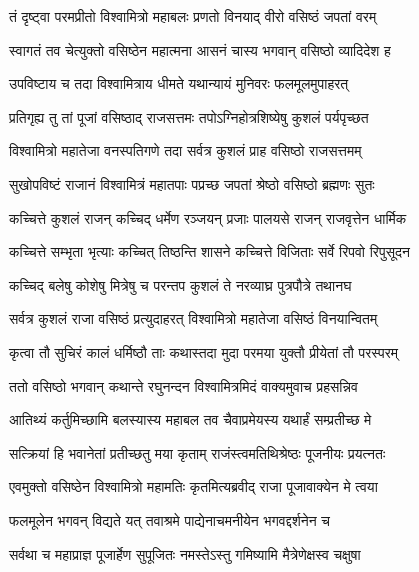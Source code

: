 
\twolineshloka
{तं दृष्ट्वा परमप्रीतो विश्वामित्रो महाबलः}
{प्रणतो विनयाद् वीरो वसिष्ठं जपतां वरम्} %

\twolineshloka
{स्वागतं तव चेत्युक्तो वसिष्ठेन महात्मना}
{आसनं चास्य भगवान् वसिष्ठो व्यादिदेश ह} %

\twolineshloka
{उपविष्टाय च तदा विश्वामित्राय धीमते}
{यथान्यायं मुनिवरः फलमूलमुपाहरत्} %

\twolineshloka
{प्रतिगृह्य तु तां पूजां वसिष्ठाद् राजसत्तमः}
{तपोऽग्निहोत्रशिष्येषु कुशलं पर्यपृच्छत} %

\twolineshloka
{विश्वामित्रो महातेजा वनस्पतिगणे तदा}
{सर्वत्र कुशलं प्राह वसिष्ठो राजसत्तमम्} %

\twolineshloka
{सुखोपविष्टं राजानं विश्वामित्रं महातपाः}
{पप्रच्छ जपतां श्रेष्ठो वसिष्ठो ब्रह्मणः सुतः} %

\twolineshloka
{कच्चित्ते कुशलं राजन् कच्चिद् धर्मेण रञ्जयन्}
{प्रजाः पालयसे राजन् राजवृत्तेन धार्मिक} %

\twolineshloka
{कच्चित्ते सम्भृता भृत्याः कच्चित् तिष्ठन्ति शासने}
{कच्चित्ते विजिताः सर्वे रिपवो रिपुसूदन} %

\twolineshloka
{कच्चिद् बलेषु कोशेषु मित्रेषु च परन्तप}
{कुशलं ते नरव्याघ्र पुत्रपौत्रे तथानघ} %

\twolineshloka
{सर्वत्र कुशलं राजा वसिष्ठं प्रत्युदाहरत्}
{विश्वामित्रो महातेजा वसिष्ठं विनयान्वितम्} %

\twolineshloka
{कृत्वा तौ सुचिरं कालं धर्मिष्ठौ ताः कथास्तदा}
{मुदा परमया युक्तौ प्रीयेतां तौ परस्परम्} %

\twolineshloka
{ततो वसिष्ठो भगवान् कथान्ते रघुनन्दन}
{विश्वामित्रमिदं वाक्यमुवाच प्रहसन्निव} %

\twolineshloka
{आतिथ्यं कर्तुमिच्छामि बलस्यास्य महाबल}
{तव चैवाप्रमेयस्य यथार्हं सम्प्रतीच्छ मे} %

\twolineshloka
{सत्क्रियां हि भवानेतां प्रतीच्छतु मया कृताम्}
{राजंस्त्वमतिथिश्रेष्ठः पूजनीयः प्रयत्नतः} %

\twolineshloka
{एवमुक्तो वसिष्ठेन विश्वामित्रो महामतिः}
{कृतमित्यब्रवीद् राजा पूजावाक्येन मे त्वया} %

\twolineshloka
{फलमूलेन भगवन् विद्यते यत् तवाश्रमे}
{पाद्येनाचमनीयेन भगवद्दर्शनेन च} %

\twolineshloka
{सर्वथा च महाप्राज्ञ पूजार्हेण सुपूजितः}
{नमस्तेऽस्तु गमिष्यामि मैत्रेणेक्षस्व चक्षुषा} %


